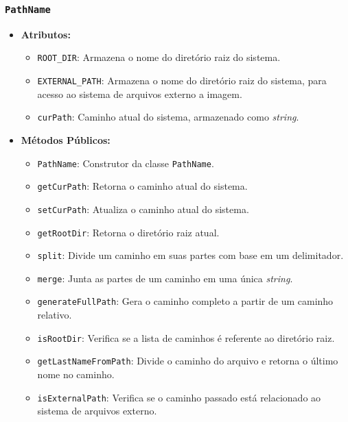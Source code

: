 \documentclass[
    12pt,				%
    oneside,   	        %
    a4paper,			%
    english,			%
    french,				%
    spanish,			%
    brazil,				%
    ]{pacotes/abntex2}
\begin{document}
\subsubsection{\texttt{PathName}}
\label{subsubsec:path_name}

\begin{itemize}
    \item \textbf{Atributos:}
        \begin{itemize}
            \item \texttt{ROOT\_DIR}: Armazena o nome do diretório raiz do sistema.
            \item \texttt{EXTERNAL\_PATH}: Armazena o nome do diretório raiz do sistema, para acesso ao sistema de arquivos externo a imagem.
            \item \texttt{curPath}: Caminho atual do sistema, armazenado como \textit{string}.
        \end{itemize}
    \item \textbf{Métodos Públicos:}
        \begin{itemize}
            \item \texttt{PathName}: Construtor da classe \texttt{PathName}.
            \item \texttt{getCurPath}: Retorna o caminho atual do sistema.
            \item \texttt{setCurPath}: Atualiza o caminho atual do sistema.
            \item \texttt{getRootDir}: Retorna o diretório raiz atual.
            \item \texttt{split}: Divide um caminho em suas partes com base em um delimitador.
            \item \texttt{merge}: Junta as partes de um caminho em uma única \textit{string}.
            \item \texttt{generateFullPath}: Gera o caminho completo a partir de um caminho relativo.
            \item \texttt{isRootDir}: Verifica se a lista de caminhos é referente ao diretório raiz.
            \item \texttt{getLastNameFromPath}: Divide o caminho do arquivo e retorna o último nome no caminho.
            \item \texttt{isExternalPath}: Verifica se o caminho passado está relacionado ao sistema de arquivos externo.
        \end{itemize}
\end{itemize}
\end{document}
